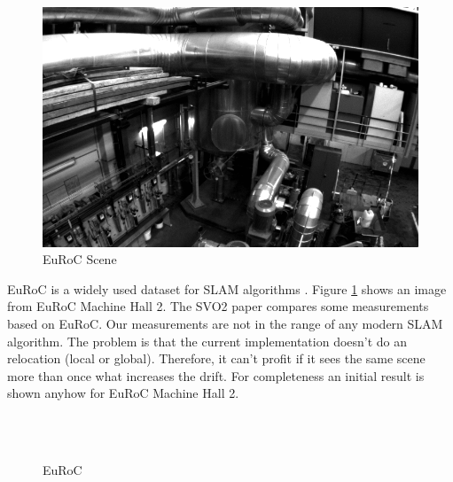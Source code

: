 \documentclass[11pt,a4paper,titlepage,oneside]{report}
\begin{document}
\begin{figure}[H]
  \includegraphics[width=1.0\textwidth]{img/euroc_scene.png}
  \caption{EuRoC Scene}\label{fig:euroc_scene}
\end{figure}

EuRoC is a widely used dataset for SLAM algorithms \cite{euroc}. Figure \ref{fig:euroc_scene} shows an image from EuRoC Machine Hall 2. The SVO2 paper \cite{svo2} compares some measurements based on EuRoC. Our measurements are not in the range of any modern SLAM algorithm. The problem is that the current implementation doesn't do an relocation (local or global). Therefore, it can't profit if it sees the same scene more than once what increases the drift. For completeness an initial result is shown anyhow for EuRoC Machine Hall 2.

\begin{figure}[H]
  \\
  \\
  \caption{EuRoC }\label{fig:euroc}
\end{figure}
\end{document}
